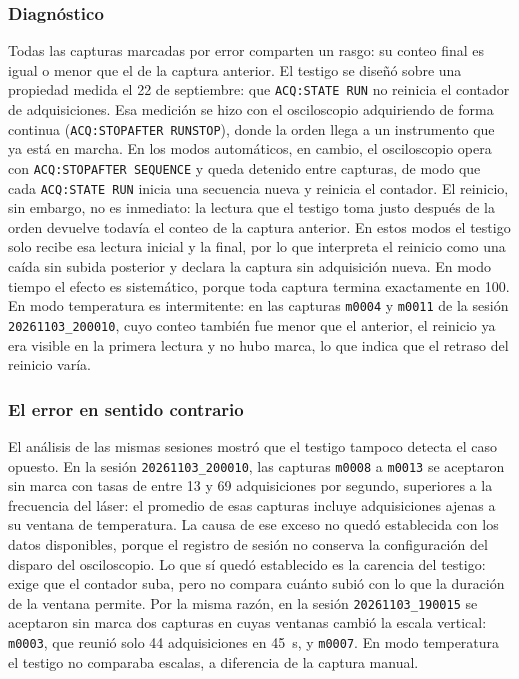 \subsubsection*{Diagnóstico}

Todas las capturas marcadas por error comparten un rasgo: su conteo
final es igual o menor que el de la captura anterior. El testigo se
diseñó sobre una propiedad medida el 22 de septiembre: que
\texttt{ACQ:STATE RUN} no reinicia el contador de adquisiciones. Esa
medición se hizo con el osciloscopio adquiriendo de forma continua
(\texttt{ACQ:STOPAFTER RUNSTOP}), donde la orden llega a un
instrumento que ya está en marcha. En los modos automáticos, en
cambio, el osciloscopio opera con \texttt{ACQ:STOPAFTER SEQUENCE} y
queda detenido entre capturas, de modo que cada \texttt{ACQ:STATE RUN}
inicia una secuencia nueva y reinicia el contador. El reinicio, sin
embargo, no es inmediato: la lectura que el testigo toma justo después
de la orden devuelve todavía el conteo de la captura anterior. En
estos modos el testigo solo recibe esa lectura inicial y la final, por
lo que interpreta el reinicio como una caída sin subida posterior y
declara la captura sin adquisición nueva. En modo tiempo el efecto es
sistemático, porque toda captura termina exactamente en 100. En modo
temperatura es intermitente: en las capturas \texttt{m0004} y
\texttt{m0011} de la sesión \texttt{20261103\_200010}, cuyo conteo
también fue menor que el anterior, el reinicio ya era visible en la
primera lectura y no hubo marca, lo que indica que el retraso del
reinicio varía.

\subsubsection*{El error en sentido contrario}

El análisis de las mismas sesiones mostró que el testigo tampoco
detecta el caso opuesto. En la sesión \texttt{20261103\_200010}, las
capturas \texttt{m0008} a \texttt{m0013} se aceptaron sin marca con
tasas de entre 13 y 69 adquisiciones por segundo, superiores a la
frecuencia del láser: el promedio de esas capturas incluye
adquisiciones ajenas a su ventana de temperatura. La causa de ese
exceso no quedó establecida con los datos disponibles, porque el
registro de sesión no conserva la configuración del disparo del
osciloscopio. Lo que sí quedó establecido es la carencia del testigo:
exige que el contador suba, pero no compara cuánto subió con lo que la
duración de la ventana permite. Por la misma razón, en la sesión
\texttt{20261103\_190015} se aceptaron sin marca dos capturas en cuyas
ventanas cambió la escala vertical: \texttt{m0003}, que reunió solo 44
adquisiciones en \SI{45}{\second}, y \texttt{m0007}. En modo
temperatura el testigo no comparaba escalas, a diferencia de la
captura manual.

